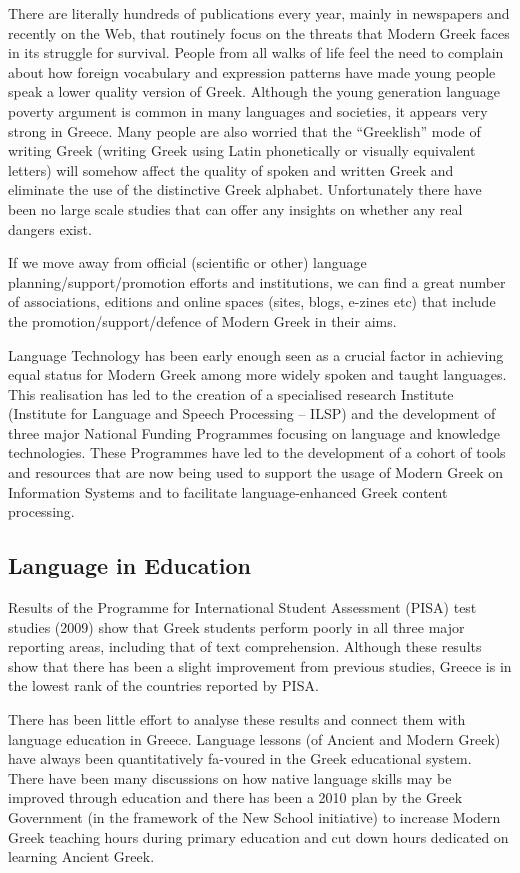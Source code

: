\begin{multicols}{2}
There are literally hundreds of publications every year, mainly in newspapers and recently on the Web, that routinely focus on the threats that Modern Greek faces in its struggle for survival. People from all walks of life feel the need to complain about how foreign vocabulary and expression patterns have made young people speak a lower quality version of Greek. Although the young generation language poverty argument is common in many languages and societies, it appears very strong in Greece. Many people are also worried that the “Greeklish” mode of writing Greek (writing Greek using Latin phonetically or visually equivalent letters) will somehow affect the quality of spoken and written Greek and eliminate the use of the distinctive Greek alphabet. Unfortunately there have been no large scale studies that can offer any insights on whether any real dangers exist.

If we move away from official (scientific or other) language planning/support/promotion efforts and institutions, we can find a great number of associations, editions and online spaces (sites, blogs, e-zines etc) that include the promotion/support/defence of Modern Greek in their aims.

Language Technology has been early enough seen as a crucial factor in achieving equal status for Modern Greek among more widely spoken and taught languages. This realisation has led to the creation of a specialised research Institute (Institute for Language and Speech Processing – ILSP) and the development of three major National Funding Programmes focusing on language and knowledge technologies. These Programmes have led to the development of a cohort of tools and resources that are now being used to support the usage of Modern Greek on Information Systems and to facilitate language-enhanced Greek content processing.

\subsection{Language in Education}

Results of the Programme for International Student Assessment (PISA) test studies (2009) \cite{Pisa2} show that Greek students perform poorly in all three major reporting areas, including that of text comprehension. Although these results show that there has been a slight improvement from previous studies, Greece is in the lowest rank of the countries reported by PISA.

There has been little effort to analyse these results and connect them with language education in Greece. Language lessons (of Ancient and Modern Greek) have always been quantitatively fa-voured in the Greek educational system. There have been many discussions on how native language skills may be improved through education and there has been a 2010 plan by the Greek Government (in the framework of the New School initiative) to increase Modern Greek teaching hours during primary education and cut down hours dedicated on learning Ancient Greek.


\end{multicols}
